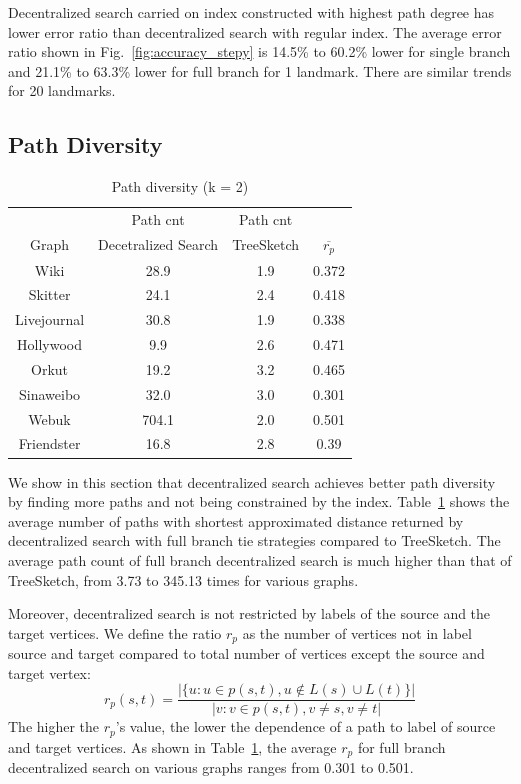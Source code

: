 Decentralized search carried on index constructed with highest path degree has lower error ratio than decentralized search with regular index. The average error ratio shown in Fig.~\ref{fig:accuracy_stepy} is 14.5\% to 60.2\% lower for single branch and 21.1\% to 63.3\% lower for full branch for 1 landmark. There are similar trends for 20 landmarks.

\subsection{Path Diversity}
\label{eval_diversity}

\begin{table}
	\vspace{-0.5cm}
	\caption{Path diversity (k = 2)}
  \label{table:pdiv}
  \centering
  \begin{tabular}{c|ccc} \hline
		&Path cnt&Path cnt& \\
		Graph&Decetralized Search&TreeSketch&$\overline{r_p}$ \\ \hline
		Wiki&28.9&1.9&0.372 \\ 
		Skitter&24.1&2.4&0.418 \\ 
		Livejournal&30.8&1.9&0.338 \\ 
		Hollywood&9.9&2.6&0.471 \\ 
		Orkut&19.2&3.2&0.465 \\ 
		Sinaweibo&32.0&3.0&0.301 \\ 
		Webuk&704.1&2.0&0.501 \\ 
		Friendster&16.8&2.8&0.39 \\ \hline
  \end{tabular}
	\vspace{-0.3cm}
\end{table}

We show in this section that decentralized search achieves better path diversity by finding more paths and not being constrained by the index. Table~\ref{table:pdiv} shows the average number of paths with shortest approximated distance returned by decentralized search with full branch tie strategies compared to TreeSketch. The average path count of full branch decentralized search is much higher than that of TreeSketch, from 3.73 to 345.13 times for various graphs.

Moreover, decentralized search is not restricted by labels of the source and the target vertices. We define the ratio $r_p$ as the number of vertices not in label source and target compared to total number of vertices except the source and target vertex:
\[
r_p(s,t) = \frac{|\{u:u \in p(s,t), u \notin L(s) \cup L(t)\}|}{|{v:v \in p(s,t), v \neq s, v \neq t}|}
\]
The higher the $r_p$'s value, the lower the dependence of a path to label of source and target vertices. As shown in Table~\ref{table:pdiv}, the average $r_p$ for full branch decentralized search on various graphs ranges from 0.301 to 0.501.

